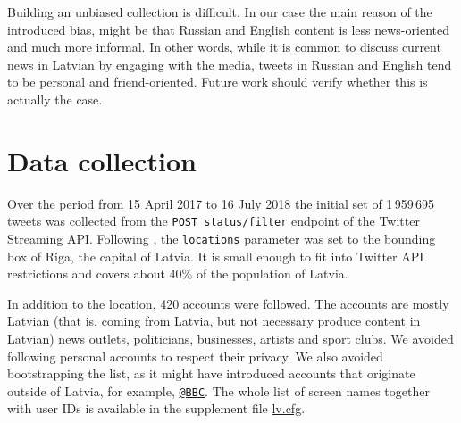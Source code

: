 \documentclass{IOS-Book-Article}
\makeatletter
\newcommand{\hl}[1]{#1}
\newcommand{\sn}[1]{\href{https://twitter.com/#1}{\texttt{@#1}}}
\newcommand{\zenodoBase}{https://zenodo.org/record/1313732}
\newcommand{\sfile}[1]{\href{\zenodoBase/files/#1}{#1}}
\makeatother
\begin{document}

Building an unbiased collection is difficult.  In our case the main reason of the introduced bias, might be that Russian and English content is less news-oriented and much more informal. In other words, while it is common to discuss current news in Latvian by engaging with the media, tweets in Russian and English tend to be personal and friend-oriented. Future work should verify whether this is actually the case.

\section{Data collection}
\label{sec:data-collection}



Over the period from 15 April 2017 to \hl{16 July 2018} the initial set of \hl{1\,959\,695} tweets was collected from the \texttt{POST status/filter} endpoint of the Twitter Streaming API. Following \cite{milajevs:2017:BUCC}, the \texttt{locations} parameter was set to the bounding box of Riga, the capital of Latvia. It is small enough to fit into Twitter API restrictions and covers about 40\% of the population of Latvia.\footnotemark{}
%

In addition to the location, 420 accounts were followed.\footnotemark{} The accounts are mostly Latvian (that is, coming from Latvia, but not necessary produce content in Latvian) news outlets, politicians, businesses, artists and sport clubs. We avoided following personal accounts to respect their privacy. We also avoided bootstrapping the list, as it might have introduced accounts that originate outside of Latvia, for example, \sn{BBC}. The whole list of screen names together with user IDs is available in the supplement file \sfile{lv.cfg}.

\end{document}
